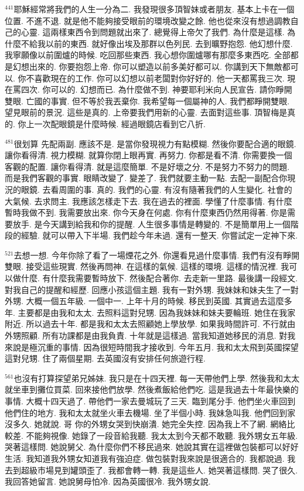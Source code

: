 \documentclass{book}
\begin{document}
$^{441}$耶穌經常將我們的人生一分為二.
我發現很多頂智妹或者朋友.
基本上卡在一個位置.
不進不退.
就是他不能夠接受眼前的環境改變之餘.
他也從來沒有想過調教自己的心靈.
這兩樣東西令到問題就出來了.
總覺得上帝欠了我們.
為什麼是這樣.
為什麼不給我以前的東西.
就好像出埃及那群以色列民.
去到曠野抱怨.
他幻想什麼.
我寧願像以前圍爐的時候.
吃回那些東西.
我心想你圍爐哪有那麼多東西吃.
全部都是幻想出來的.
你要抱怨上帝.
你可以塑造以前多美好都可以.
你講到天下無敵都可以.
你不喜歡現在的工作.
你可以幻想以前老闆對你好好的.
他一天都罵我三次.
現在罵四次.
你可以的.
幻想而已.
為什麼做不到.
神要耶利米向人民宣告.
請你睜開雙眼.
亡國的事實.
但不等於我丟棄你.
我希望每一個屬神的人.
我們都睜開雙眼.
望見眼前的景況.
這些是真的.
上帝要我們用新的心靈.
去面對這些事.
頂智梅是真的.
你上一次配眼鏡是什麼時候.
經過眼鏡店看到它八折.

$^{481}$很划算 先配兩副.
應該不是.
是當你發現視力有點模糊.
然後你要配合適的眼鏡.
讓你看得清.
視力模糊.
就算你閉上眼再實.
再努力.
你都是看不清.
你需要換一個客觀的配置.
讓你看得清.
就是這麼簡單.
不是好壞之分.
不是努力不努力的問題.
而是我們客觀的事實.
眼睛改變了.
變差了.
我們就要主動一點.
去配一副配合你現況的眼鏡.
去看周圍的事.
真的.
我們的心靈.
有沒有隨著我們的人生變化.
社會的大氣候.
去求問主.
我應該怎樣走下去.
我在過去的裡面.
學懂了什麼事情.
有什麼暫時我做不到.
我需要放出來.
你今天身在何處.
你有什麼東西仍然用得著.
你是需要放手.
是今天講到給我和你的提醒.
人生很多事情是轉變的.
不是簡單用上一個階段的經驗.
就可以帶入下半場.
我們趁今年未過.
還有一整天.
你嘗試定一定神下來.

$^{521}$去想一想.
今年你除了看了一場煙花之外.
你還看見過什麼事情.
我們有沒有睜開雙眼.
接受這些現實.
然後再問神.
在這樣的氣候.
這樣的環境.
這樣的情況裡.
我可以做什麼.
有什麼我需要暫時放下.
然後配合著你.
去走新一里路.
最後講一段經文.
對我自己的提醒和經歷.
回應小孩這個主題.
我有一對外甥.
我妹妹和妹夫生了一對外甥.
大概一個五年級.
一個中一.
上年十月的時候.
移民到英國.
其實過去這麼多年.
主要都是由我和太太.
去照料這對兒甥.
因為我妹妹和妹夫要輪班.
她住在我家附近.
所以過去十年.
都是我和太太去照顧她上學放學.
如果我時間許可.
不行就由外甥照顧.
所有功課都是由我負責.
十年就是這樣過.
當我知道她移民的消息.
對我來說是極沉重的事情.
因為很短時間我才接收到.
今年五月.
我和太太飛到英國探望這對兒甥.
住了兩個星期.
去英國沒有安排任何旅遊行程.

$^{561}$也沒有打算探望弟兄姊妹.
我只是在十四天裡.
每一天帶他們上學.
然後我和太太就坐車到攤位買菜.
回來接他們放學.
然後煮飯給他們吃.
這是我過去十年最快樂的事情.
大概十四天過了.
帶他們一家去曼城玩了三天.
臨到尾分手.
他們坐火車回到他們住的地方.
我和太太就坐火車去機場.
坐了半個小時.
我妹急叫我.
他們回到家沒多久.
她就說.
哥 你的外甥女哭到快崩潰.
她完全失控.
因為我上不了網.
網絡比較差.
不能夠視像.
她錄了一段音給我聽.
我太太到今天都不敢聽.
我外甥女五年級.
哭著這樣問.
她說舅父.
為什麼你們不移民過來.
她說其實在這裡做包裝都可以好好生活.
我知道我外甥女知道我有強迫症.
做包裝對我來說是很適合的.
我都說過.
我去到超級市場見到罐頭歪了.
我都會轉一轉.
我是這些人.
她哭著這樣問.
哭了很久.
我回答她留言.
她說舅母怕冷.
因為英國很冷.
我外甥女說.
\end{document}
